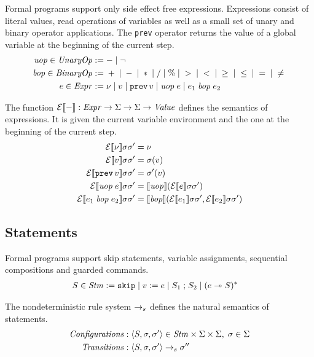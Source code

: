 \documentclass[a4paper,10pt,english]{article}
\begin{document}
Formal programs support only side effect free expressions. Expressions consist of literal values, read operations of variables as
well as a small set of unary and binary operator applications. The \texttt{prev} operator returns the value of a global
variable at the beginning of the current step.
\begin{align*}
	\mathit{uop} \in \mathit{UnaryOp} & := - \mid \neg
	\\
    \mathit{bop} \in \mathit{BinaryOp} & := {} + {} \mid {} - {} \mid {} \ast {} \mid {} / {}
                       \mid {} \% {} \mid {} > {} \mid {} < {} \mid {} \geq {} 
                       \mid {} \leq {} \mid {} = {} \mid {} \neq {}
	\\
	e \in \mathit{Expr} & := 
		\nu \mid
		v \mid
		\mathtt{prev} \,v \mid
		\mathit{uop}\; e \mid
		e_1 \;\mathit{bop}\; e_2
\end{align*}

The function $\mathcal{E} \llbracket - \rrbracket : \mathit{Expr} \rightarrow \Sigma \rightarrow \Sigma \rightarrow \mathit{Value}$ defines the semantics of
expressions. It is given the current variable environment and the one at the beginning of the current step.
\begin{align*}
	\mathcal{E} \llbracket \nu \rrbracket \sigma \sigma' &= \nu \\
	\mathcal{E} \llbracket v \rrbracket \sigma \sigma' &= \sigma(v) \\
	\mathcal{E} \llbracket \mathtt{prev} \,v \rrbracket \sigma \sigma' &= \sigma'(v) \\
	\mathcal{E} \llbracket \mathit{uop}\; e \rrbracket \sigma \sigma' &= \llbracket \mathit{uop} \rrbracket (\mathcal{E} \llbracket e \rrbracket \sigma \sigma') \\
	\mathcal{E} \llbracket e_1 \;\mathit{bop}\; e_2 \rrbracket \sigma \sigma' &= \llbracket \mathit{bop} \rrbracket (\mathcal{E} \llbracket e_1 \rrbracket \sigma
	\sigma', \mathcal{E} \llbracket e_2 \rrbracket \sigma	\sigma')
\end{align*}

\subsection{Statements}

Formal programs support skip statements, variable assignments, sequential compositions and guarded commands.
\begin{align*}
	S \in \mathit{Stm} & :=
		\mathtt{skip} \mid 
		v\; \mathtt{:=}\; e \mid 
		S_1 \; \mathtt{;} \; S_2 \mid
		(e \; \mathtt{\twoheadrightarrow} \; S)^*
\end{align*}

The nondeterministic rule system $\rightarrow_s$ defines the natural semantics of statements.
\begin{align*}
	\mathit{Configurations} : & \;\langle S, \sigma, \sigma' \rangle \in \mathit{Stm} \times \Sigma \times \Sigma, \; 
	\sigma \in \Sigma
	\\
	\mathit{Transitions} : & \;\langle S, \sigma, \sigma' \rangle \rightarrow_s \sigma''
\end{align*}
\end{document}
